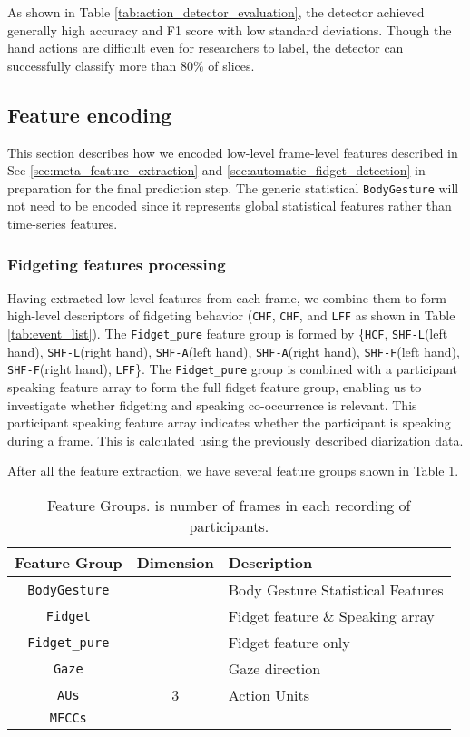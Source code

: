 As shown in Table \ref{tab:action_detector_evaluation}, the detector achieved generally high accuracy and F1 score with low standard deviations. Though the hand actions are difficult even for researchers to label, the detector can successfully classify more than 80\% of slices.
\vspace{-0.3cm}
\subsection{Feature encoding}\label{sec:feature_encoding}
This section describes how we encoded low-level frame-level features described in Sec \ref{sec:meta_feature_extraction} and \ref{sec:automatic_fidget_detection} in preparation for the final prediction step. The generic statistical \texttt{BodyGesture} will not need to be encoded since it represents global statistical features rather than time-series features.\vspace{-0.3cm}
\subsubsection{Fidgeting features processing}
Having extracted low-level features from each frame, we combine them to form high-level descriptors of fidgeting behavior (\texttt{CHF}, \texttt{CHF}, and \texttt{LFF} as shown in Table \ref{tab:event_list}). 
The \texttt{Fidget\_pure} feature group is formed by \{\texttt{HCF}, \texttt{SHF-L}(left hand), \texttt{SHF-L}(right hand), \texttt{SHF-A}(left hand), \texttt{SHF-A}(right hand), \texttt{SHF-F}(left hand), \texttt{SHF-F}(right hand), \texttt{LFF}\}. 
The \texttt{Fidget\_pure} group is combined with a participant speaking feature array to form the full fidget feature group, enabling us to investigate whether fidgeting and speaking co-occurrence is relevant.
This participant speaking feature array indicates whether the participant is speaking during a frame.
This is calculated using the previously described diarization data.


After all the feature extraction, we have several feature groups shown in Table \ref{tab:feature_group}.
\begin{table}[]
    \centering
    \begin{tabular}{ccl}
    \toprule
        Feature Group & Dimension & Description\\
        \midrule
        \texttt{BodyGesture} &  & Body Gesture Statistical Features\\
        \texttt{Fidget} &  & Fidget feature \& Speaking array\\
        \texttt{Fidget\_pure} &  & Fidget feature only\\
        \texttt{Gaze} &  & Gaze direction \\
        \texttt{AUs} & 3 & Action Units \\
        \texttt{MFCCs} &  & \\
    \bottomrule
    \end{tabular}
    \vspace{0.2cm}
    \caption{Feature Groups.  is number of frames in each recording of participants.}
    \label{tab:feature_group}
    \vspace{-10mm}
\end{table}
\vspace{-0.3cm}
